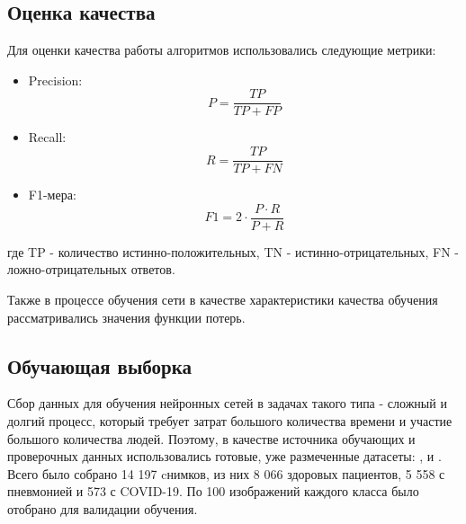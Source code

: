 
\subsection{Оценка качества}
Для оценки качества работы алгоритмов использовались следующие метрики:
\begin{itemize}
    \item Precision: \[P = \frac{TP}{TP+FP}\]
    \item Recall: \[R=\frac{TP}{TP+FN}\] 
    \item F1-мера: \[F1=2 \cdot \frac{P \cdot R}{P+R}\] 
\end{itemize}
где TP - количество истинно-положительных, TN - истинно-отрицательных, 
FN - ложно-отрицательных ответов.

Также в процессе обучения сети в качестве характеристики качества обучения рассматривались значения функции потерь.

\subsection{Обучающая выборка}
Сбор данных для обучения нейронных сетей в задачах такого типа - сложный и долгий процесс, который требует затрат большого количества времени и участие большого количества людей. Поэтому, в качестве источника обучающих и проверочных данных использовались готовые, уже размеченные датасеты: \cite{tawsifurrahman}, \cite{cohen2020covid} и \cite{wang2020covidnet}. 
Всего было собрано 14 197 cнимков, из них 8 066 здоровых пациентов, 5 558 с пневмонией и 573 с COVID-19. По 100 изображений каждого класса было отобрано для валидации обучения.

